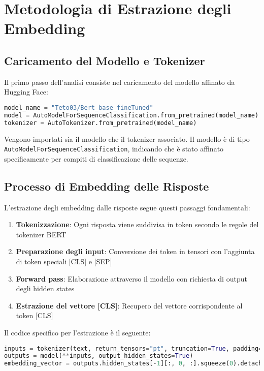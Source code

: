 \documentclass{article}
\begin{document}
\section{Metodologia di Estrazione degli Embedding}

\subsection{Caricamento del Modello e Tokenizer}

Il primo passo dell'analisi consiste nel caricamento del modello affinato da Hugging Face:

\begin{lstlisting}[language=Python]
model_name = "Teto03/Bert_base_fineTuned"
model = AutoModelForSequenceClassification.from_pretrained(model_name)
tokenizer = AutoTokenizer.from_pretrained(model_name)
\end{lstlisting}

Vengono importati sia il modello che il tokenizer associato. Il modello è di tipo \texttt{AutoModelForSequenceClassification}, indicando che è stato affinato specificamente per compiti di classificazione delle sequenze.

\subsection{Processo di Embedding delle Risposte}

L'estrazione degli embedding dalle risposte segue questi passaggi fondamentali:

\begin{enumerate}
    \item \textbf{Tokenizzazione}: Ogni risposta viene suddivisa in token secondo le regole del tokenizer BERT
    \item \textbf{Preparazione degli input}: Conversione dei token in tensori con l'aggiunta di token speciali [CLS] e [SEP]
    \item \textbf{Forward pass}: Elaborazione attraverso il modello con richiesta di output degli hidden states
    \item \textbf{Estrazione del vettore [CLS]}: Recupero del vettore corrispondente al token [CLS]
\end{enumerate}

Il codice specifico per l'estrazione è il seguente:

\begin{lstlisting}[language=Python]
inputs = tokenizer(text, return_tensors="pt", truncation=True, padding=True)
outputs = model(**inputs, output_hidden_states=True)
embedding_vector = outputs.hidden_states[-1][:, 0, :].squeeze(0).detach().cpu().numpy()
\end{lstlisting}
\end{document}
